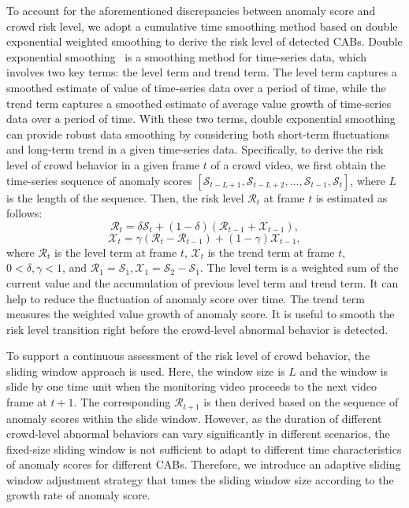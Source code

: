 \documentclass[journal]{IEEEtran}
\begin{document}
To account for the aforementioned discrepancies between anomaly score and crowd risk level, we adopt a cumulative time smoothing method based on double exponential weighted smoothing to derive the risk level of detected CABs. Double exponential smoothing~\cite{nau2017averaging} is a smoothing method for time-series data, which involves two key terms: the level term and trend term. The level term captures a smoothed estimate of value of time-series data over a period of time, while the trend term captures a smoothed estimate of average value growth of time-series data over a period of time. With these two terms, double exponential smoothing can provide robust data smoothing by considering both short-term fluctuations and long-term trend in a given time-series data. Specifically, to derive the risk level of crowd behavior in a given frame $t$ of a crowd video, we first obtain the time-series sequence of anomaly scores $[\mathcal{S}_{t-L+1}, \mathcal{S}_{t-L+2},..., \mathcal{S}_{t-1}, \mathcal{S}_{t}]$, where $L$ is the length of the sequence. Then, the risk level $\mathcal{R}_t$ at frame $t$ is estimated as follows:
\begin{equation}
\mathcal{R}_{t} = \delta \mathcal{S}_{t} + (1-\delta)(\mathcal{R}_{t-1}+\mathcal{X}_{t-1}),
\end{equation}
\begin{equation}
\mathcal{X}_{t} = \gamma (\mathcal{R}_{t} - \mathcal{R}_{t-1} ) +(1-\gamma) \mathcal{X}_{t-1},
\end{equation}
where $\mathcal{R}_{t} $ is the level term at frame $t$, $ \mathcal{X}_{t}$ is the trend term at frame $t$, $ 0< \delta,\gamma <1$, and $\mathcal{R}_{1} = \mathcal{S}_{1}, \mathcal{X}_{1} = \mathcal{S}_{2} - \mathcal{S}_{1}$. The level term is a weighted sum of the current value and the accumulation of previous level term and trend term. It can help to reduce the fluctuation of anomaly score over time. The trend term measures the weighted value growth of anomaly score. It is useful to smooth the risk level transition right before the crowd-level abnormal behavior is detected.

To support a continuous assessment of the risk level of crowd behavior, the sliding window approach is used. Here, the window size is $L$ and the window is slide by one time unit when the monitoring video proceeds to the next video frame at $t+1$. The corresponding $\mathcal{R}_{t+1}$ is then derived based on the sequence of anomaly scores within the slide window. However, as the duration of different crowd-level abnormal behaviors can vary significantly in different scenarios, the fixed-size sliding window is not sufficient to adapt to different time characteristics of anomaly scores for different CABs. Therefore, we introduce an adaptive sliding window adjustment strategy that tunes the sliding window size according to the growth rate of anomaly score.
\end{document}
